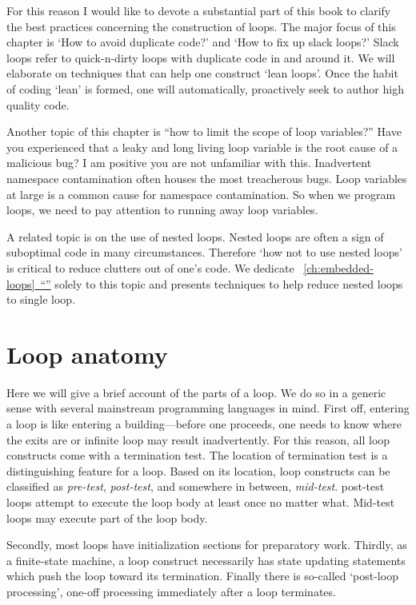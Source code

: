 \documentclass[oneside,11pt]{book}
\theoremstyle{definition}
\theoremstyle{remark}
\newcommand*{\fullref}[1]{\hyperref[{#1}]{\mbox{\autoref*{#1}~}``\nameref*{#1}''}}
\begin{document}
For this reason I would like to devote a substantial part of this book to clarify the best practices
concerning the construction of loops.
The major focus of this chapter is `How to avoid duplicate code?' and
`How to fix up slack loops?'
Slack loops refer to quick-n-dirty loops with duplicate code in and around it.
We will elaborate on techniques that can help one construct `lean loops'.
Once the habit of coding `lean' is formed, one will automatically, proactively seek to author high
quality code.



Another topic of this chapter is ``how to limit the scope of loop variables?''
Have you experienced that a leaky and long living loop variable is the root cause of a malicious
bug?
I am positive you are not unfamiliar with this.
Inadvertent namespace contamination often houses the most treacherous bugs.
Loop variables at large is a common cause for namespace contamination.
So when we program loops, we need to pay attention to running away loop variables.


A related topic is on the use of nested loops.
Nested loops are often a sign of suboptimal code in many circumstances.
Therefore `how not to use nested loops' is critical to reduce clutters out of one's code.
We dedicate ~\fullref{ch:embedded-loops} solely to this topic and presents techniques to help
reduce nested loops to single loop.


\section{Loop anatomy}\label{sec:loopAnatomy}



Here we will give a brief account of the parts of a loop.
We do so in a generic sense with several mainstream programming languages in mind.
First off, entering a loop is like entering a building---before one proceeds, one needs to know
where the exits are or infinite loop may result inadvertently.
For this reason, all loop constructs come with a termination test.
The location of termination test is a distinguishing feature for a loop.
Based on its location, loop constructs can be classified as \emph{pre-test}, \emph{post-test},
and somewhere in between, \emph{mid-test}.
post-test loops attempt to execute the loop body at least once no matter what.
Mid-test loops may execute part of the loop body.


Secondly, most loops have initialization sections for preparatory work.
Thirdly, as a finite-state machine, a loop construct necessarily has state updating statements
which push the loop toward its termination.
Finally there is so-called `post-loop processing', one-off processing immediately after a loop
terminates.
\end{document}
